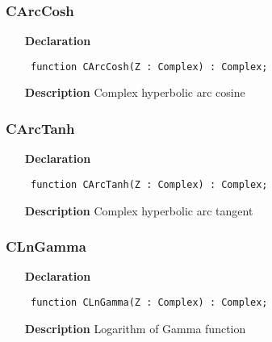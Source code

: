 \documentclass[12pt,a4paper,oneside]{report}
\newcommand{\declarationitem}[1]{\textbf{#1}}
\newcommand{\descriptiontitle}[1]{\textbf{#1}}
\newcommand{\code}[1]{\texttt{#1}}
\begin{document}
\subsubsection{CArcCosh}
\label{ucomplex-CArcCosh}
\begin{itemize}\item[\declarationitem{Declaration}\hfill]
\begin{flushleft}
\code{
function CArcCosh(Z : Complex) : Complex;}

\end{flushleft}

\par
\item[\descriptiontitle{Description}]
Complex hyperbolic arc cosine

\end{itemize}
\subsubsection{CArcTanh}
\label{ucomplex-CArcTanh}
\begin{itemize}\item[\declarationitem{Declaration}\hfill]
\begin{flushleft}
\code{
function CArcTanh(Z : Complex) : Complex;}

\end{flushleft}

\par
\item[\descriptiontitle{Description}]
Complex hyperbolic arc tangent

\end{itemize}
\subsubsection{CLnGamma}
\label{ucomplex-CLnGamma}
\begin{itemize}\item[\declarationitem{Declaration}\hfill]
\begin{flushleft}
\code{
function CLnGamma(Z : Complex) : Complex;}

\end{flushleft}

\par
\item[\descriptiontitle{Description}]
Logarithm of Gamma function

\end{itemize}
\end{document}
